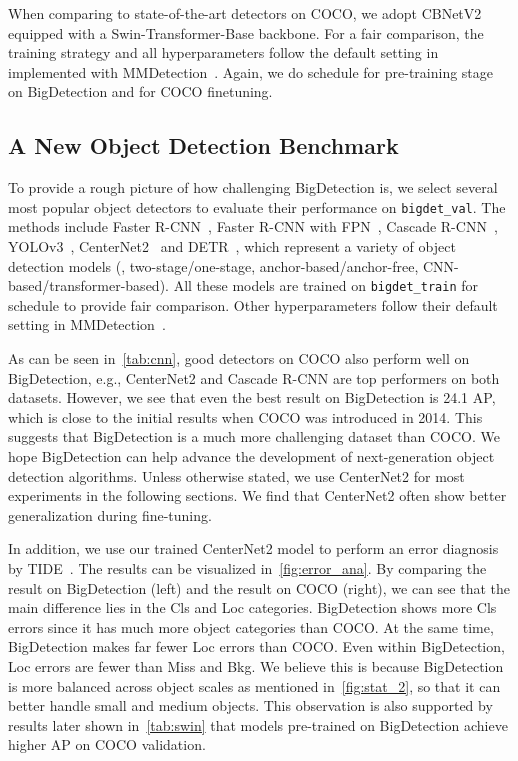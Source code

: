 \documentclass[10pt,twocolumn,letterpaper]{article}
\begin{document}
When comparing to state-of-the-art detectors on COCO, we adopt CBNetV2~\cite{liang2021cbnetv2} equipped with a Swin-Transformer-Base backbone. 
For a fair comparison, the training strategy and all hyperparameters follow the default setting in~\cite{liang2021cbnetv2} implemented with MMDetection~\cite{chen2019mmdetection}. Again, we do  schedule for pre-training stage on BigDetection and  for COCO finetuning.

\subsection{A New Object Detection Benchmark}
\label{subsec:detbench}
To provide a rough picture of how challenging BigDetection is, we select several most popular object detectors to evaluate their performance on \verb+bigdet_val+. The methods include Faster R-CNN~\cite{ren2015faster}, Faster R-CNN with FPN~\cite{lin2017feature}, Cascade R-CNN~\cite{cai2018cascade}, YOLOv3~\cite{farhadi2018yolov3}, CenterNet2~\cite{zhou2021probabilistic} and DETR~\cite{carion2020end}, which represent a variety of object detection models (\eg, two-stage/one-stage, anchor-based/anchor-free, CNN-based/transformer-based).
All these models are trained on \verb+bigdet_train+ for  schedule to provide fair comparison. Other hyperparameters follow their default setting in MMDetection~\cite{chen2019mmdetection}.

As can be seen in~\cref{tab:cnn}, good detectors on COCO also perform well on BigDetection, e.g., CenterNet2 and Cascade R-CNN are top performers on both datasets. However, we see that even the best result on BigDetection is 24.1 AP, which is close to the initial results when COCO was introduced in 2014. This suggests that BigDetection is a much more challenging dataset than COCO. We hope BigDetection can help advance the development of next-generation object detection algorithms. 
Unless otherwise stated, we use CenterNet2 for most experiments in the following sections. We find that CenterNet2 often show better generalization during fine-tuning.

In addition, we use our trained CenterNet2 model to perform an error diagnosis by TIDE~\cite{tide-eccv2020}. The results can be visualized in~\cref{fig:error_ana}. By comparing the result on BigDetection (left) and the result on COCO (right), we can see that the main difference lies in the Cls and Loc categories. BigDetection shows more Cls errors since it has much more object categories than COCO. At the same time, BigDetection makes far fewer Loc errors than COCO. Even within BigDetection, Loc errors are fewer than Miss and Bkg. We believe this is because BigDetection is more balanced across object scales as mentioned in~\cref{fig:stat_2}, so that it can better handle small and medium objects. This observation is also supported by results later shown in~\cref{tab:swin} that models pre-trained on BigDetection achieve higher AP on COCO validation. 
\end{document}
